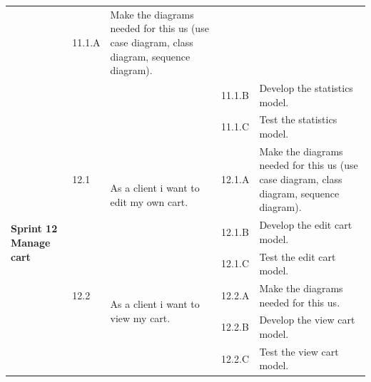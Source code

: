 \documentclass[12pt,a4paper]{report}
\begin{document}
\begin{table}[H]
\begin{center}
\begin{tabular}{|  p{3cm}|  p{1cm}| p{4cm}|  p{1cm}| p{6cm}|}
			&				                      
			11.1.A &                        
			Make the diagrams needed for this \ac{us} (use case diagram, class diagram, sequence diagram).
			\\ 
			\cline{4-5}    
			&                   
			&                                 
			&                        
			11.1.B &                        
			Develop the statistics model.
			\\ 
			\cline{4-5}    
			&                   
			&                                 
			&                        
			11.1.C &                        
			Test the statistics model.
		\\
		\hline
		\multirow{5}{3cm}{\textbf{Sprint 12} \textbf{Manage cart} }
		&                       
		12.1  &  
		\multirow{2}{4cm}{As a client i want to edit my own cart.}
		
		&				                      
		12.1.A &                        
		Make the diagrams needed for this \ac{us} (use case diagram, class diagram, sequence diagram).
		\\ 
		\cline{4-5}    
		&                   
		&                                 
		&                        
		12.1.B &                        
		Develop the edit cart model.
		\\ 
		\cline{4-5}    
		&                   
		&                                 
		&                        
		12.1.C &                        
		Test the edit cart model.
		\\
		\cline{2-5}  
		
		&                       
		12.2  &  
		\multirow{2}{4cm}{As a client i want to view my cart.}
		
		&				                      
		12.2.A &                        
		Make the diagrams needed for this \ac{us}.
		\\ 
		\cline{4-5}    
		&                   
		&                                 
		&                        
		12.2.B &                        
		Develop the view cart model.
		\\ 
		\cline{4-5}    
		&                   
		&                                 
		&                        
		12.2.C &                        
		Test the view cart model.
	
		\end{tabular}
		
	\end{center}
	
\end{table}
\end{document}
